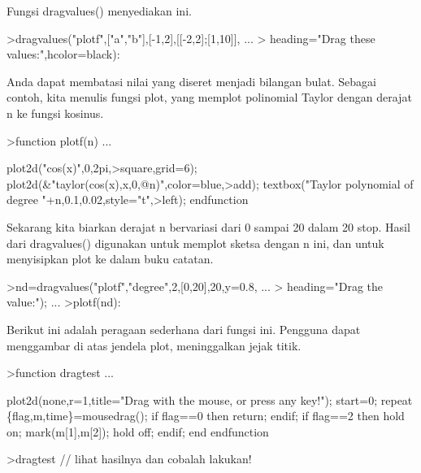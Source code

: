 \documentclass[12pt,arial,letterpaper]{book}
\begin{document}
\begin{eulernootebook}
\begin{eulercomment}
\begin{eulercomment}
\begin{eulernootebook}
\begin{eulercomment}
\begin{eulercomment}
\begin{eulercomment}
\begin{eulercomment}
\begin{eulercomment}
\begin{eulercomment}
\begin{eulercomment}
\begin{eulernotebook}
\begin{eulercomment}
\begin{eulercomment}
\begin{eulercomment}
\begin{eulercomment}
\begin{eulercomment}
Fungsi dragvalues() menyediakan ini.
\end{eulercomment}
\begin{eulerprompt}
>dragvalues("plotf",["a","b"],[-1,2],[[-2,2];[1,10]], ...
>  heading="Drag these values:",hcolor=black):
\end{eulerprompt}
\begin{eulercomment}
Anda dapat membatasi nilai yang diseret menjadi bilangan bulat.
Sebagai contoh, kita menulis fungsi plot, yang memplot polinomial
Taylor dengan derajat n ke fungsi kosinus.
\end{eulercomment}
\begin{eulerprompt}
>function plotf(n) ...
\end{eulerprompt}
\begin{eulerudf}
  plot2d("cos(x)",0,2pi,>square,grid=6);
  plot2d(&"taylor(cos(x),x,0,@n)",color=blue,>add);
  textbox("Taylor polynomial of degree "+n,0.1,0.02,style="t",>left);
  endfunction
\end{eulerudf}
\begin{eulercomment}
Sekarang kita biarkan derajat n bervariasi dari 0 sampai 20 dalam 20
stop. Hasil dari dragvalues() digunakan untuk memplot sketsa dengan n
ini, dan untuk menyisipkan plot ke dalam buku catatan.
\end{eulercomment}
\begin{eulerprompt}
>nd=dragvalues("plotf","degree",2,[0,20],20,y=0.8, ...
>   heading="Drag the value:"); ...
>plotf(nd):
\end{eulerprompt}
\begin{eulercomment}
Berikut ini adalah peragaan sederhana dari fungsi ini. Pengguna dapat
menggambar di atas jendela plot, meninggalkan jejak titik.
\end{eulercomment}
\begin{eulerprompt}
>function dragtest ...
\end{eulerprompt}
\begin{eulerudf}
    plot2d(none,r=1,title="Drag with the mouse, or press any key!");
    start=0;
    repeat
      \{flag,m,time\}=mousedrag();
      if flag==0 then return; endif;
      if flag==2 then
        hold on; mark(m[1],m[2]); hold off;
      endif;
    end
  endfunction
\end{eulerudf}
\begin{eulerprompt}
>dragtest // lihat hasilnya dan cobalah lakukan!

\end{eulerprompt}
\end{eulercomment}
\end{eulercomment}
\end{eulercomment}
\end{eulercomment}
\end{eulernotebook}
\end{eulercomment}
\end{eulercomment}
\end{eulercomment}
\end{eulercomment}
\end{eulercomment}
\end{eulercomment}
\end{eulercomment}
\end{eulernootebook}
\end{eulercomment}
\end{eulercomment}
\end{eulernootebook}
\end{document}
